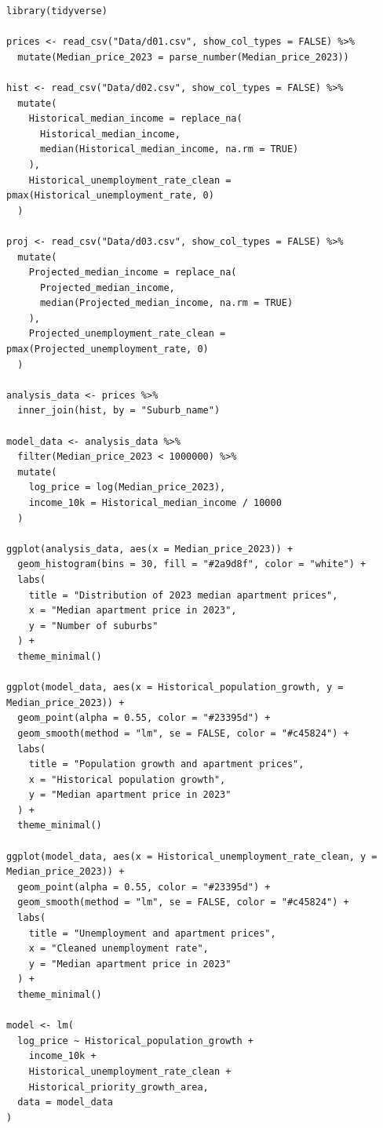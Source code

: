 \documentclass[11pt]{article}
\begin{document}
\begin{lstlisting}[style=rcode]
library(tidyverse)

prices <- read_csv("Data/d01.csv", show_col_types = FALSE) %>%
  mutate(Median_price_2023 = parse_number(Median_price_2023))

hist <- read_csv("Data/d02.csv", show_col_types = FALSE) %>%
  mutate(
    Historical_median_income = replace_na(
      Historical_median_income,
      median(Historical_median_income, na.rm = TRUE)
    ),
    Historical_unemployment_rate_clean = pmax(Historical_unemployment_rate, 0)
  )

proj <- read_csv("Data/d03.csv", show_col_types = FALSE) %>%
  mutate(
    Projected_median_income = replace_na(
      Projected_median_income,
      median(Projected_median_income, na.rm = TRUE)
    ),
    Projected_unemployment_rate_clean = pmax(Projected_unemployment_rate, 0)
  )

analysis_data <- prices %>%
  inner_join(hist, by = "Suburb_name")

model_data <- analysis_data %>%
  filter(Median_price_2023 < 1000000) %>%
  mutate(
    log_price = log(Median_price_2023),
    income_10k = Historical_median_income / 10000
  )

ggplot(analysis_data, aes(x = Median_price_2023)) +
  geom_histogram(bins = 30, fill = "#2a9d8f", color = "white") +
  labs(
    title = "Distribution of 2023 median apartment prices",
    x = "Median apartment price in 2023",
    y = "Number of suburbs"
  ) +
  theme_minimal()

ggplot(model_data, aes(x = Historical_population_growth, y = Median_price_2023)) +
  geom_point(alpha = 0.55, color = "#23395d") +
  geom_smooth(method = "lm", se = FALSE, color = "#c45824") +
  labs(
    title = "Population growth and apartment prices",
    x = "Historical population growth",
    y = "Median apartment price in 2023"
  ) +
  theme_minimal()

ggplot(model_data, aes(x = Historical_unemployment_rate_clean, y = Median_price_2023)) +
  geom_point(alpha = 0.55, color = "#23395d") +
  geom_smooth(method = "lm", se = FALSE, color = "#c45824") +
  labs(
    title = "Unemployment and apartment prices",
    x = "Cleaned unemployment rate",
    y = "Median apartment price in 2023"
  ) +
  theme_minimal()

model <- lm(
  log_price ~ Historical_population_growth +
    income_10k +
    Historical_unemployment_rate_clean +
    Historical_priority_growth_area,
  data = model_data
)


\end{lstlisting}
\end{document}
